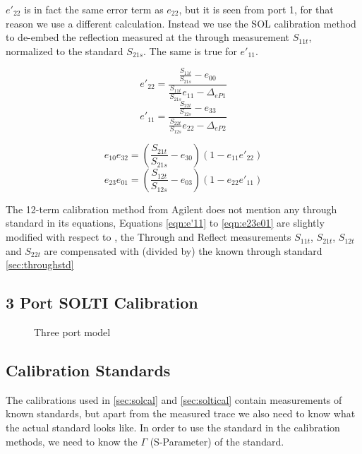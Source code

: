 $e'_{22}$ is in fact the same error term as $e_{22}$, but it is seen from port 1, for that reason we use a different calculation. Instead we use the SOL calibration method to de-embed the reflection measured at the through measurement $S_{11t}$, normalized to the standard $S_{21s}$. The same is true for $e'_{11}$. 

\begin{equation}
\label{eqn:e'22}
e'_{22} = \frac{\frac{S_{11t}}{S_{21s}}-e_{00}}{\frac{S_{11t}}{S_{21s}}e_{11}-\Delta_{eP1}}
\end{equation}
\begin{equation}
\label{eqn:e'11}
e'_{11} = \frac{\frac{S_{22t}}{S_{12s}}-e_{33}}{\frac{S_{22t}}{S_{12s}}e_{22}-\Delta_{eP2}}
\end{equation}

\begin{equation}
\label{eqn:e10e32}
e_{10}e_{32} = \left(\frac{S_{21t}}{S_{21s}} - e_{30}\right)\left(1-e_{11}e'_{22}\right)
\end{equation}
\begin{equation}
\label{eqn:e23e01}
e_{23}e_{01} = \left(\frac{S_{12t}}{S_{12s}} - e_{03}\right)\left(1-e_{22}e'_{11}\right)
\end{equation}

The 12-term calibration method from Agilent \cite{agilent_calibration} does not mention any through standard in its equations, Equations \ref{eqn:e'11} to \ref{eqn:e23e01} are slightly modified with respect to \cite{agilent_calibration}, the Through and Reflect measurements $S_{11t}$, $S_{21t}$, $S_{12t}$ and $S_{22t}$ are compensated with (divided by) the known through standard \ref{sec:throughstd}

\subsection{3 Port SOLTI Calibration}
\label{sec:3psoltical}

\begin{figure}[H]
	\centering
	
	\caption{Three port model}
	\label{fig:threeportmodel}
\end{figure}


\subsection{Calibration Standards}
\label{sec:calstds}

The calibrations used in \ref{sec:solcal} and \ref{sec:soltical} contain measurements of known standards, but apart from the measured trace we also need to know what the actual standard looks like. In order to use the standard in the calibration methods, we need to know the $\Gamma$ (S-Parameter) of the standard.
